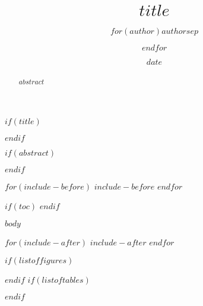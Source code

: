\documentclass[oneside]{tuftish-ebook}
\title{$title$}
\author{$for(author)$$author$$sep$ \and $endfor$}
\date{$date$}
\begin{document}
$if(title)$
\maketitle
$endif$

$if(abstract)$
\begin{abstract}
\noindent $abstract$
\end{abstract}
$endif$

$for(include-before)$
$include-before$
$endfor$

$if(toc)$
\hypersetup{linkcolor=blue}
\setcounter{tocdepth}{$toc-depth$}
\tableofcontents
$endif$

$body$

$for(include-after)$
$include-after$
$endfor$

\backmatter
$if(listoffigures)$
\listoffigures
$endif$
$if(listoftables)$
\listoftables
$endif$

\printindex
\end{document}
